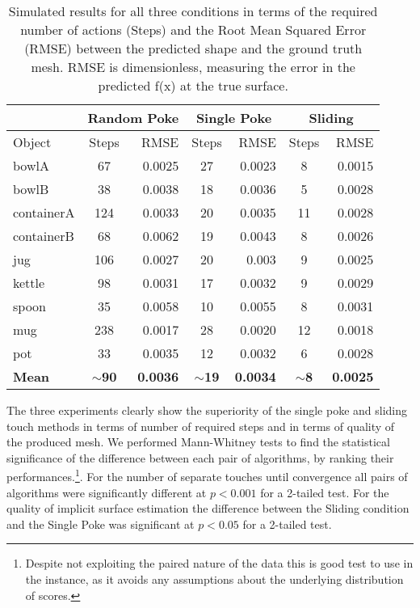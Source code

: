 \begin{table}
    \centering
    \begin{tabular}{|l|c|r|c|r|c|r|} \hline
        & \multicolumn{2}{|c|}{Random Poke} & \multicolumn{2}{c|}{Single Poke} & \multicolumn{2}{c|}{Sliding}\\
        \hline
        Object & Steps & RMSE & Steps & RMSE & Steps & RMSE\\
        \hline
        bowlA & 67 & 0.0025 & 27 & 0.0023 &8 & 0.0015\\
        bowlB & 38 & 0.0038 &18 & 0.0036 & 5 & 0.0028\\
        containerA & 124 & 0.0033 & 20 & 0.0035 & 11 & 0.0028\\
        containerB & 68 & 0.0062 & 19 & 0.0043 & 8 & 0.0026\\
        jug & 106 & 0.0027 & 20 & 0.003 & 9 & 0.0025\\
        kettle & 98 & 0.0031 & 17 & 0.0032 & 9 & 0.0029\\
        spoon & 35 & 0.0058 & 10 & 0.0055 & 8 & 0.0031\\
        mug & 238 & 0.0017 & 28 & 0.0020 & 12 & 0.0018\\
        pot & 33 & 0.0035 & 12 & 0.0032 & 6 & 0.0028\\
        \hline
        \textbf{Mean} & $\sim$\textbf{90} & \textbf{0.0036} & $\sim$\textbf{19} & \textbf{0.0034} & $\sim$\textbf{8} & \textbf{0.0025}\\
        \hline
    \end{tabular}
    \caption{Simulated results for all three conditions in terms of the required number of actions (Steps) and the Root Mean Squared Error (RMSE) between the predicted shape and the ground truth mesh. RMSE is dimensionless, measuring the error in the predicted f(x) at the true surface.}
    \label{tab:tests}
\end{table}

The three experiments clearly show the superiority of the single poke and sliding touch methods in terms of number of required steps
and in terms of quality of the produced mesh. We performed Mann-Whitney tests to find the statistical significance of the difference between each pair of algorithms, by ranking their performances.\footnote{Despite not exploiting the paired nature of the data this is good test to use in the instance, as it avoids any assumptions about the underlying distribution of scores.}. For the number of separate touches until convergence all pairs of algorithms were significantly different at $p<0.001$ for a 2-tailed test. For the quality of implicit surface estimation the difference between the Sliding condition and the Single Poke was significant at $p<0.05$ for a 2-tailed test.

